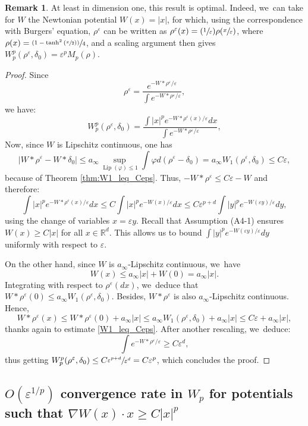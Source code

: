 \documentclass[11pt]{article}
\newcommand{\Subsection}{\subsection}
\numberwithin{equation}{section}
\newcommand{\Psfrac}[2]{(\sfrac{#1}{#2})}
\newcommand{\psfrac}[2]{\sfrac{(#1)}{#2}}
\DeclareMathOperator{\Lip}{Lip}
\def\RR{\mathbb{R}}
\def\eps{\varepsilon}
\theoremstyle{plain}
\theoremstyle{definition}
\newtheorem{remark}[theorem]{Remark}
\begin{document}
\begin{remark}
At least in dimension one, this result is optimal. Indeed, we~can take for $W$ the Newtonian potential $W(x)=|x|$, for which, using the correspondence with Burgers' equation, $\rho^\eps$ can be written as $\rho^\eps(x) = \Psfrac{1}{\eps} \rho(\sfrac{x}{\eps})$, where $\rho(x) = \psfrac{1-\tanh^2\left(\sfrac{x}{2}\right)}{4}$, and a scaling argument then gives $W_p^p(\rho^\eps, \delta_0) = \eps^p M_p(\rho)$.
\end{remark}
\begin{proof}
Since
\[
\rho^\eps = \frac{e^{-W * \rho^\eps / \eps}}{\int e^{-W * \rho^\eps / \eps}},
\]
we have:
\[
W_p^p(\rho^\eps, \delta_0) = \frac{\int |x|^p e^{-W * \rho^\eps(x) / \eps} dx}{\int e^{-W * \rho^\eps / \eps}},
\]
Now, since $W$ is Lipschitz continuous, one has
\[
|W*\rho^\eps - W*\delta_0| \leq a_\infty \sup_{\Lip(\varphi) \leq 1} \int \varphi d(\rho^\eps - \delta_0) = a_\infty W_1(\rho^\eps, \delta_0) \leq C \eps,
\]
because of Theorem \ref{thm:W1_leq_Ceps}. Thus, $-W*\rho^\eps \leq C\eps - W$ and therefore:
\[
\int |x|^p e^{-W * \rho^\eps(x) / \eps} dx \leq C \int |x|^p e^{-W(x) / \eps}dx
\leq C\eps^{p+d} \int |y|^p e^{-W(\eps y) / \eps} dy,
\]
using the change of variables $x = \eps y$. Recall that Assumption (A4-1) ensures $W(x) \geq C|x|$ for all $x \in \RR^d$. This allows us to bound $\int |y|^p e^{-W(\eps y) / \eps} dy$ uniformly with respect to $\eps$.

On the other hand, since $W$ is $a_\infty$-Lipschitz continuous, we~have
\[
W(x) \leq a_\infty |x| + W(0) = a_\infty |x|.
\]
Integrating with respect to $\rho^\eps(dx)$, we~deduce that $W * \rho^\eps(0) \leq a_\infty W_1(\rho^\eps, \delta_0)$. Besides, $W * \rho^\eps$ is also $a_\infty$-Lipschitz continuous. Hence,
\[
W * \rho^\eps(x) \leq W * \rho^\eps(0) + a_\infty |x| \leq a_\infty W_1(\rho^\eps, \delta_0) + a_\infty |x| \leq C\eps + a_\infty |x|,
\]
thanks again to estimate \eqref{W1_leq_Ceps}. After another rescaling, we~deduce:
\[
\int e^{-W * \rho^\eps / \eps} \geq C \eps^d,
\]
thus getting $W_p^p(\rho^\eps, \delta_0) \leq C \sfrac{\eps^{p+d}}{\eps^d} = C\eps^p$, which concludes the proof.
\end{proof}

\Subsection{$O(\eps^{1/p})$ convergence rate in $W_p$ for potentials such that $\nabla W(x) \cdot x \geq C |x|^p$}
\end{document}
